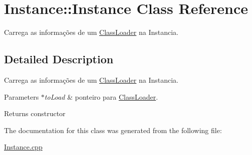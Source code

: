 \hypertarget{class_instance_1_1_instance}{}\section{Instance\+:\+:Instance Class Reference}
\label{class_instance_1_1_instance}


Carrega as informações de um \hyperlink{class_class_loader}{Class\+Loader} na Instancia.  




\subsection{Detailed Description}
Carrega as informações de um \hyperlink{class_class_loader}{Class\+Loader} na Instancia. 


\begin{DoxyParams}{Parameters}
{\em $\ast$to\+Load} & ponteiro para \hyperlink{class_class_loader}{Class\+Loader}. \\
\hline
\end{DoxyParams}
\begin{DoxyReturn}{Returns}
constructor 
\end{DoxyReturn}


The documentation for this class was generated from the following file\+:\begin{DoxyCompactItemize}
\item 
\hyperlink{_instance_8cpp}{Instance.\+cpp}\end{DoxyCompactItemize}
